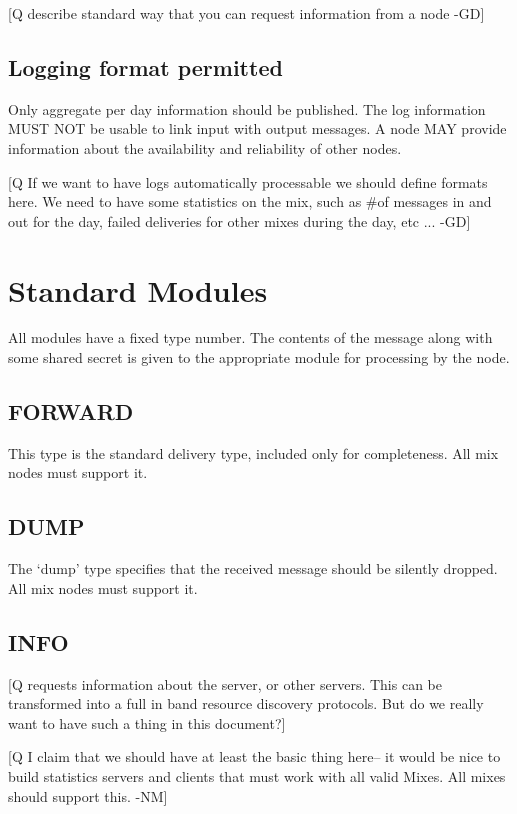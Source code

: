 \documentclass{article}
\begin{document}
[Q describe standard way that you can request information from a
node -GD]

\subsection{Logging format permitted}

Only aggregate per day information should be published. The
log information MUST NOT be usable to link input with output
messages. A node MAY provide information about the availability and
reliability of other nodes.

[Q If we want to have logs automatically processable we should define
formats here. We need to have some statistics on the mix, such as \#of
messages in and out for the day, failed deliveries for other mixes
during the day, etc ... -GD]

\section{Standard Modules}

All modules have a fixed type number. The contents of the message
along with some shared secret is given to the appropriate module for
processing by the node.

\subsection{FORWARD}

This type is the standard delivery type, included only for completeness.
All mix nodes must support it.

\subsection{DUMP}

The `dump' type specifies that the received message should be silently
dropped. All mix nodes must support it.

\subsection{INFO}

[Q requests information about the server, or other servers. This can be
transformed into a full in band resource discovery protocols. But do
we really want to have such a thing in this document?]

[Q I claim that we should have at least the basic thing here-- it
would be nice to build statistics servers and clients that must work
with all valid Mixes.  All mixes should support this. -NM]
\end{document}
